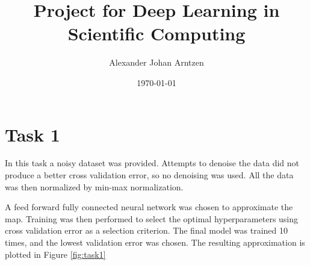 \documentclass[a4paper]{article}
\title{Project for Deep Learning in Scientific Computing}
\author{Alexander Johan Arntzen }
\date{\today}
\begin{document}
\maketitle

\section*{Task 1}
In this task a noisy dataset was provided. Attempts to denoise the data did not produce a better cross validation error, so no denoising was used. All the data was then normalized by min-max normalization.

A feed forward fully connected neural network was chosen to approximate the map. Training was then performed to select the optimal hyperparameters using cross validation error as a selection criterion. The final model was trained 10 times, and the lowest validation error was chosen. The resulting approximation is plotted in Figure \ref{fig:task1}
\end{document}
